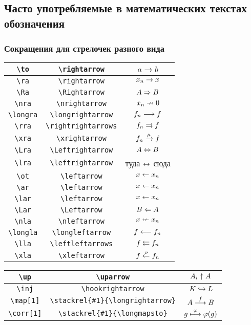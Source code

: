 \documentclass[a4paper]{article}
\begin{document}
\subsection{Часто употребляемые в математических текстах обозначения}

\subsubsection{Сокращения для стрелочек разного вида}

\begin{center}
\begin{tabular}{|c|c|c|}
\hline\verb'\to' & \verb'\rightarrow' & $a \to b$ \\
\hline\verb'\ra' & \verb'\rightarrow' &   $x_n \rightarrow x$     \\
\hline\verb'\Ra' & \verb'\Rightarrow' &   $A\Rightarrow B$     \\
\hline\verb'\nra' & \verb'\nrightarrow' &     $x_n \nrightarrow 0$   \\
\hline\verb'\longra' & \verb'\longrightarrow' &  $f_n \longrightarrow f$      \\
\hline\verb'\rra' & \verb'\rightrightarrows' &   $f_n \rightrightarrows f$     \\
\hline\verb'\xra' & \verb'\xrightarrow' &      $f_n \xrightarrow{\mu} f$  \\
\hline\verb'\Lra' & \verb'\Leftrightarrow' &   $A \Leftrightarrow B$     \\
\hline\verb'\lra' & \verb'\leftrightarrow' &    туда $\leftrightarrow$ сюда    \\
\hline\verb'\ot' & \verb'\leftarrow' &   $x \leftarrow x_n$     \\
\hline\verb'\ar' & \verb'\leftarrow' &  $x \leftarrow x_n$      \\
\hline\verb'\lar' & \verb'\leftarrow' &  $x \leftarrow x_n$      \\
\hline\verb'\Lar' & \verb'\Leftarrow' &   $B \Leftarrow A$     \\
\hline\verb'\nla' & \verb'\nleftarrow' &    $x \nleftarrow x_n$    \\
\hline\verb'\longla' & \verb'\longleftarrow' &   $f \longleftarrow f_n$     \\
\hline\verb'\lla' & \verb'\leftleftarrows' &    $f \leftleftarrows f_n$    \\
\hline\verb'\xla' & \verb'\xleftarrow' &     $f \xleftarrow{\nu} f_n$ \\
\hline
\end{tabular}
\end{center}
\begin{center}
\begin{tabular}{|c|c|c|}
\hline\verb'\up' & \verb'\uparrow' &     $A_i \uparrow A$   \\
\hline\verb'\inj' & \verb'\hookrightarrow' &     $K \hookrightarrow L$   \\
\hline\verb'\map[1]' & \verb'\stackrel{#1}{\longrightarrow}' &  $A \stackrel{f}{\longrightarrow} B$      \\
\hline\verb'\corr[1]' & \verb'\stackrel{#1}{\longmapsto}' &     $g \stackrel{\varphi}{\longmapsto} \varphi(g)$   \\
\hline
\end{tabular}
\end{center}
\end{document}
